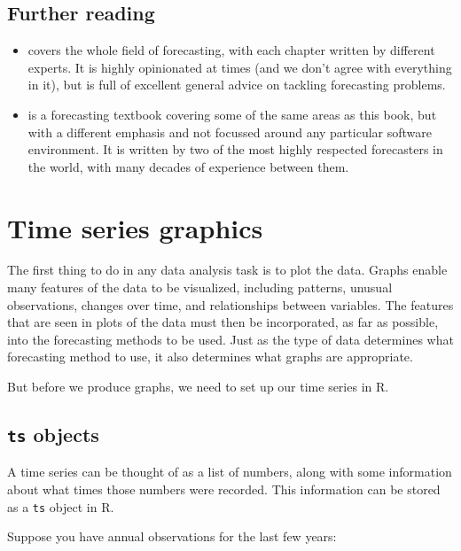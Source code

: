 \documentclass[]{book}
\begin{document}
\hypertarget{further-reading}{%
\section{Further reading}\label{further-reading}}

\begin{itemize}
\item
  \citet{Armstrong01} covers the whole field of forecasting, with each chapter written by different experts. It is highly opinionated at times (and we don't agree with everything in it), but is full of excellent general advice on tackling forecasting problems.
\item
  \citet{Ord2012} is a forecasting textbook covering some of the same areas as this book, but with a different emphasis and not focussed around any particular software environment. It is written by two of the most highly respected forecasters in the world, with many decades of experience between them.
\end{itemize}

\hypertarget{ch-graphics}{%
\chapter{Time series graphics}\label{ch-graphics}}

The first thing to do in any data analysis task is to plot the data. Graphs enable many features of the data to be visualized, including patterns, unusual observations, changes over time, and relationships between variables. The features that are seen in plots of the data must then be incorporated, as far as possible, into the forecasting methods to be used. Just as the type of data determines what forecasting method to use, it also determines what graphs are appropriate.

But before we produce graphs, we need to set up our time series in R.

\hypertarget{ts-objects}{%
\section{\texorpdfstring{\texttt{ts} objects}{ts objects}}\label{ts-objects}}

A time series can be thought of as a list of numbers, along with some information about what times those numbers were recorded. This information can be stored as a \texttt{ts} object in R.

Suppose you have annual observations for the last few years:
\end{document}
